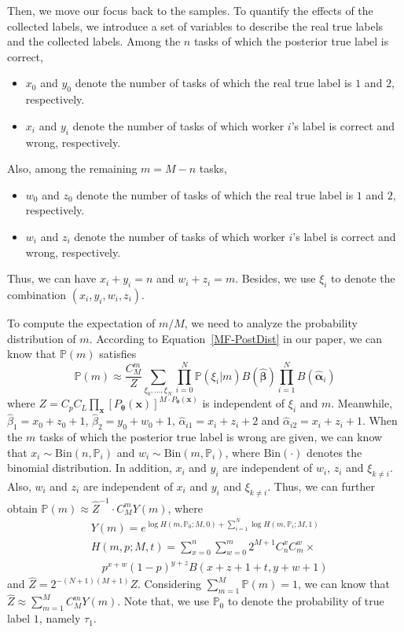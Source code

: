 \documentclass{article}
\begin{document}
Then, we move our focus back to the samples.
To quantify the effects of the collected labels, we introduce a set of variables to describe the real true labels and the collected labels.
Among the $n$ tasks of which the posterior true label is correct,
\begin{itemize}[noitemsep,topsep=0pt]
\item $x_0$ and $y_0$ denote the number of tasks of which the real true label is $1$ and $2$, respectively.
\item $x_i$ and $y_i$ denote the number of tasks of which worker $i$'s label is correct and wrong, respectively.
\end{itemize}
Also, among the remaining $m=M-n$ tasks, 
\begin{itemize}[noitemsep,topsep=0pt]
\item $w_0$ and $z_0$ denote the number of tasks of which the real true label is $1$ and $2$, respectively.
\item $w_i$ and $z_i$ denote the number of tasks of which worker $i$'s label is correct and wrong, respectively.
\end{itemize}
Thus, we can have $x_i+y_i=n$ and $w_i+z_i=m$. Besides, we use $\xi_i$ to denote the combination $(x_i,y_i,w_i, z_i)$.

To compute the expectation of $m/M$, we need to analyze the probability distribution of $m$. According to Equation~\ref{MF-PostDist} in our paper, we can know that $\mathbb{P}(m)$ satisfies
\begin{equation}
\mathbb{P}(m) \approx \frac{C_{M}^{m}}{Z} \sum_{\xi_0,\ldots, \xi_N}\prod_{i=0}^{N}\mathbb{P}(\xi_i|m) B(\hat{\bm{\beta}})\prod_{i=1}^{N}B(\hat{\bm{\alpha}}_{i})
\end{equation}
where $Z=C_pC_L{\prod}_{\bm{x}} [P_{\bm{\theta}}(\bm{x})]^{M\cdot P_{\bm{\theta}}(\bm{x})}$ is independent of $\xi_i$ and $m$.
Meanwhile, $\hat{\beta}_1=x_0+z_0+1$, $\hat{\beta}_2=y_0+w_0+1$, $\hat{\alpha}_{i1}=x_i+z_i+2$ and $\hat{\alpha}_{i2}=x_i+z_i+1$.
When the $m$ tasks of which the posterior true label is wrong are given, we can know that $x_i\sim \mathrm{Bin}(n, \mathbb{P}_i)$ and $w_i\sim \mathrm{Bin}(m, \mathbb{P}_i)$, where $\mathrm{Bin}(\cdot)$ denotes the binomial distribution.
In addition, $x_i$ and $y_i$ are independent of $w_i$, $z_i$ and $\xi_{k\neq i}$.
Also, $w_i$ and $z_i$ are independent of $x_i$ and $y_i$ and $\xi_{k\neq i}$.
Thus, we can further obtain $\mathbb{P}(m)\approx \hat{Z}^{-1}\cdot C_{M}^{m}Y(m)$, where
\begin{equation}
\label{PDist}
\begin{split}
&Y(m) =e^{\log H(m,\mathbb{P}_0;M,0)+\sum_{i=1}^{N}\log H(m,\mathbb{P}_i;M,1)}\\
&H(m,p;M,t)={\sum}_{x=0}^{n}{\sum}_{w=0}^{m} 2^{M+1}C_{n}^{x}C_{m}^{w}\times\\
&\quad p^{x+w}(1-p)^{y+z}B(x+z+1+t,y+w+1)
\end{split}
\end{equation}
and $\hat{Z}=2^{-(N+1)(M+1)}Z$.
Considering $\sum_{m=1}^{M} \mathbb{P}(m)=1$, we can know that $\hat{Z}\approx{\sum}_{m=1}^{M}C_{M}^{m}Y(m)$. Note that, we use $\mathbb{P}_0$ to denote the probability of true label $1$, namely $\tau_1$.
\end{document}

